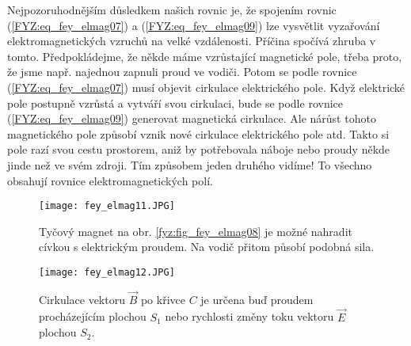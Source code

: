     Nejpozoruhodnějším důsledkem našich rovnic je, že spojením rovnic (\ref{FYZ:eq_fey_elmag07}) a
    (\ref{FYZ:eq_fey_elmag09}) lze vysvětlit vyzařování elektromagnetických vzruchů na velké vzdálenosti. 
    Příčina spočívá zhruba v tomto. Předpokládejme, že někde máme vzrůstající magnetické pole, třeba proto, 
    že jsme např. najednou zapnuli proud ve vodiči. Potom se podle rovnice (\ref{FYZ:eq_fey_elmag07}) musí 
    objevit cirkulace elektrického pole. Když elektrické pole postupně vzrůstá a vytváří svou cirkulaci, 
    bude se podle rovnice (\ref{FYZ:eq_fey_elmag09}) generovat magnetická cirkulace. Ale nárůst tohoto 
    magnetického pole způsobí vznik nové cirkulace elektrického pole atd. Takto si pole razí svou cestu 
    prostorem, aniž by potřebovala náboje nebo proudy někde jinde než ve svém zdroji. Tím způsobem jeden 
    druhého vidíme! To všechno obsahují rovnice elektromagnetických polí.

    \begin{figure}
      \texttt{[image: fey\_elmag11.JPG]}
      \caption{Tyčový magnet na obr. \ref{fyz:fig_fey_elmag08} je možné nahradit cívkou s      
               elektrickým proudem. Na vodič přitom působí podobná sila.}
      \label{fyz:fig_fey_elmag11}
    \end{figure}  
        
    \begin{figure}
      \texttt{[image: fey\_elmag12.JPG]}
      \caption{Cirkulace vektoru \(\vec{B}\) po křivce \(C\) je určena buď proudem procházejícím 
               plochou \(S_1\) nebo rychlosti změny toku vektoru \(\vec{E}\) plochou \(S_2\).}
      \label{fyz:fig_fey_elmag12}
    \end{figure}
   
